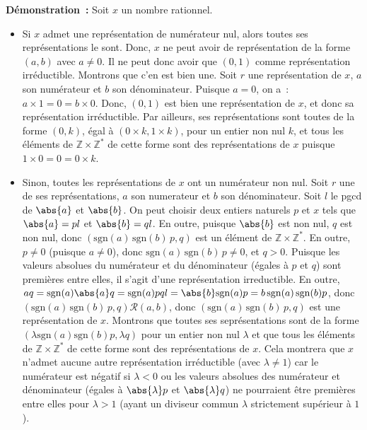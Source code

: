\noindent\textbf{Démonstration :} Soit $x$ un nombre rationnel. 
\begin{itemize}[nosep]
    \item Si $x$ admet une représentation de numérateur nul, alors toutes ses représentations le sont.
        Donc, $x$ ne peut avoir de représentation de la forme $(a, b)$ avec $a \neq 0$.
        Il ne peut donc avoir que $(0, 1)$ comme représentation irréductible.
        Montrons que c'en est bien une. 
        Soit $r$ une représentation de $x$, $a$ son numérateur et $b$ son dénominateur. 
        Puisque $a = 0$, on a : $a \times 1 = 0 = b \times 0$. 
        Donc, $(0, 1)$ est bien une représentation de $x$, et donc sa représentation irréductible. 
        Par ailleurs, ses représentations sont toutes de la forme $(0, k)$, égal à $(0 \times k, 1 \times k)$, pour un entier non nul $k$, et tous les éléments de $\mathbb{Z} \times \mathbb{Z}^*$ de cette forme sont des représentations de $x$ puisque $1 \times 0 = 0 = 0 \times k$.
    \item Sinon, toutes les représentations de $x$ ont un numérateur non nul. 
        Soit $r$ une de ses représentations, $a$ son numerateur et $b$ son dénominateur. 
        Soit $l$ le pgcd de $\abs{a}$ et $\abs{b}$.
        On peut choisir deux entiers naturels $p$ et $x$ tels que $\abs{a} = p l$ et $\abs{b} = q l$.
        En outre, puisque $\abs{b}$ est non nul, $q$ est non nul, donc $(\mathrm{sgn}(a) \, \mathrm{sgn}(b) \, p, q)$ est un élément de $\mathbb{Z} \times \mathbb{Z}^*$. 
        En outre, $p \neq 0$ (puisque $a \neq 0$), donc $\mathrm{sgn}(a) \, \mathrm{sgn}(b) \, p \neq 0$, et $q > 0$. 
        Puisque les valeurs absolues du numérateur et du dénominateur (égales à $p$ et $q$) sont premières entre elles, il s'agit d'une représentation irreductible.
        En outre, $a q = \mathrm{sgn}(a) \abs{a} q = \mathrm{sgn}(a) p q l = \abs{b} \mathrm{sgn}(a) p = b \, \mathrm{sgn}(a) \, \mathrm{sgn}(b) p$, donc $(\mathrm{sgn}(a) \, \mathrm{sgn}(b) \, p, q) \mathrel{\mathcal{R}} (a, b)$, donc $(\mathrm{sgn}(a) \, \mathrm{sgn}(b) \, p, q)$ est une représentation de $x$.
        Montrons que toutes ses seprésentations sont de la forme $(\lambda \mathrm{sgn}(a) \mathrm{sgn}(b) p, \lambda q)$ pour un entier non nul $\lambda$ et que tous les éléments de $\mathbb{Z} \times \mathbb{Z}^*$ de cette forme sont des représentations de $x$.
        Cela montrera que $x$ n'admet aucune autre représentation irréductible (avec $\lambda \neq 1$) car le numérateur est négatif si $\lambda < 0$ ou les valeurs absolues des numérateur et dénominateur (égales à $\abs{\lambda} p$ et $\abs{\lambda} q$) ne pourraient être premières entre elles pour $\lambda > 1$ (ayant un diviseur commun $\lambda$ strictement supérieur à $1$).

\end{itemize}
